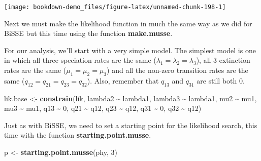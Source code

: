 \documentclass[
]{book}
\newenvironment{Shaded}{\begin{snugshade}}{\end{snugshade}}
\newcommand{\DecValTok}[1]{\textcolor[rgb]{0.00,0.00,0.81}{#1}}
\newcommand{\KeywordTok}[1]{\textcolor[rgb]{0.13,0.29,0.53}{\textbf{#1}}}
\newcommand{\NormalTok}[1]{#1}
\newcommand{\OperatorTok}[1]{\textcolor[rgb]{0.81,0.36,0.00}{\textbf{#1}}}
\newcommand{\StringTok}[1]{\textcolor[rgb]{0.31,0.60,0.02}{#1}}
\begin{document}
\begin{center}\texttt{[image: bookdown-demo\_files/figure-latex/unnamed-chunk-198-1]} \end{center}

Next we must make the likelihood function in much the same way as we did for BiSSE but this time using the function \textbf{make.musse}.

\begin{Shaded}
\end{Shaded}

For our analysis, we'll start with a very simple model. The simplest model is one in which all three speciation rates are the same (\(\lambda_{1} = \lambda_{2} = \lambda_{3}\)), all 3 extinction rates are the same (\(\mu_{1} = \mu_{2} = \mu_{3}\)) and all the non-zero transition rates are the same (\(q_{12} = q_{21} = q_{23} = q_{32}\)). Also, remember that \(q_{13}\) and \(q_{31}\) are still both 0.

\begin{Shaded}
\begin{Highlighting}[]
\NormalTok{lik.base \textless{}{-}}\StringTok{ }\KeywordTok{constrain}\NormalTok{(lik, lambda2 }\OperatorTok{\textasciitilde{}}\StringTok{ }\NormalTok{lambda1, lambda3 }\OperatorTok{\textasciitilde{}}\StringTok{ }\NormalTok{lambda1,}
\NormalTok{                      mu2 }\OperatorTok{\textasciitilde{}}\StringTok{ }\NormalTok{mu1, mu3 }\OperatorTok{\textasciitilde{}}\StringTok{ }\NormalTok{mu1,}
\NormalTok{                      q13 }\OperatorTok{\textasciitilde{}}\StringTok{ }\DecValTok{0}\NormalTok{, q21 }\OperatorTok{\textasciitilde{}}\StringTok{ }\NormalTok{q12, }
\NormalTok{                      q23 }\OperatorTok{\textasciitilde{}}\StringTok{ }\NormalTok{q12, q31 }\OperatorTok{\textasciitilde{}}\StringTok{ }\DecValTok{0}\NormalTok{, q32 }\OperatorTok{\textasciitilde{}}\StringTok{ }\NormalTok{q12)}
\end{Highlighting}
\end{Shaded}

Just as with BiSSE, we need to set a starting point for the likelihood search, this time with the function \textbf{starting.point.musse}.

\begin{Shaded}
\begin{Highlighting}[]
\NormalTok{p \textless{}{-}}\StringTok{ }\KeywordTok{starting.point.musse}\NormalTok{(phy, }\DecValTok{3}\NormalTok{)}
\end{Highlighting}
\end{Shaded}
\end{document}
